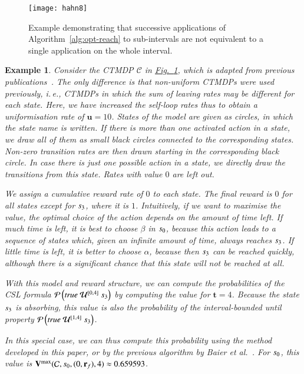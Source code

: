 \documentclass[10pt,twocolumn]{article}
\newtheorem{example}{Example}
\newcommand{\state}  {{\ensuremath s}}
\newcommand{\cmodel}{\mathcal{C}}
\newcommand{\urate}{\mathbf{u}}
\newcommand{\frew}{\mathbf{r}_f}
\newcommand{\timeb}{\mathbf{t}}
\newcommand{\mvalue}{\mathbf{V}}
\newcommand{\reffig}[1]{\texorpdfstring{\hyperref[fig:#1]{Fig.~\ref*{fig:#1}}}{Fig.~\ref*{fig:#1}}}
\begin{document}
\begin{figure}
\centering
\texttt{[image: hahn8]}
\caption{\label{fig:nountil}Example demonstrating that successive applications of
  Algorithm~\ref{alg:opt-reach} to sub-intervals are not equivalent to a single
  application on the whole interval.}
\end{figure}
\begin{example}
Consider the CTMDP $\cmodel$ in \reffig{nountil}, which is adapted
from previous publications~\cite{ZhangN10,BuchholzHHZ11}.
The only difference is that non-uniform CTMDPs were used previously,
i.\,e., CTMDPs in which the sum of leaving rates may be different for each state.
Here, we have increased the self-loop rates thus to obtain a uniformisation rate of $\urate = 10$.
States of the model are given as circles, in which the state name is written.
If there is more than one activated action in a state, we draw all of them as small black circles connected to the corresponding states.
Non-zero transition rates are then drawn starting in the corresponding black circle.
In case there is just one possible action in a state, we directly draw the transitions from this state.
Rates with value $0$ are left out.

We assign a cumulative reward rate of $0$ to each state.
The final reward is $0$ for all states except for $\state_3$, where it is $1$.
Intuitively, if we want to maximise the value, the optimal choice of the action depends on the amount of time left.
If much time is left, it is best to choose $\beta$ in $\state_0$, because this action leads to a sequence of states which, given an infinite amount of time, always reaches $\state_3$.
If little time is left, it is better to choose $\alpha$, because then $\state_3$ can be reached quickly, although there is a significant chance that this state will not be reached at all.

With this model and reward structure, we can compute the probabilities of the CSL formula
$\mathcal{P}\left( \mathit{true}\ \mathcal{U}^{[0,4]}\ \state_3 \right)$
by computing the value for $\timeb = 4$.
Because the state $\state_3$ is absorbing, this value is also the probability of the interval-bounded until property
$\mathcal{P}\left( \mathit{true}\ \mathcal{U}^{[1,4]}\ \state_3 \right)$.

In this special case, we can thus compute this probability using the method developed in this paper, or by the previous algorithm by Baier et al.~\cite{BaierHKH05}.
For $\state_0$, this value is $\mvalue^{\max}(\cmodel, \state_0, (0, \frew), 4) \approx 0.659593$.


\end{example}
\end{document}
